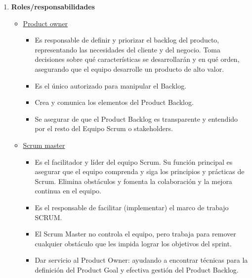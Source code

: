 \documentclass[12pt, letterpaper]{article}
\begin{document}
\begin{enumerate}
    
    \item \textbf{Roles/responsabilidades}
        \begin{itemize}
            \item \underline{Product owner}
                \begin{itemize}
                    \item Es responsable de definir y priorizar el backlog del producto, representando las 
                    necesidades del cliente y del negocio. Toma decisiones sobre qué características se 
                    desarrollarán y en qué orden, asegurando que el equipo desarrolle un producto de alto valor.
                    \item Es el único autorizado para manipular el Backlog.
                    \item Crea y comunica los elementos del Product Backlog.
                    \item Se asegurar de que el Product Backlog es transparente y entendido por el resto del 
                    Equipo Scrum o stakeholders.
                \end{itemize}
            
            \item \underline{Scrum master}
                \begin{itemize}
                    \item Es el facilitador y líder del equipo Scrum. Su función principal es asegurar que el 
                    equipo comprenda y siga los principios y prácticas de Scrum. Elimina obstáculos y fomenta 
                    la colaboración y la mejora continua en el equipo.
                    \item Es el responsable de facilitar (implementar) el marco de trabajo SCRUM.
                    \item El Scrum Master no controla el equipo, pero trabaja para remover cualquier obstáculo 
                    que les impida lograr los objetivos del sprint.
                    \item Dar servicio al Product Owner: ayudando a encontrar técnicas para la definición del 
                    Product Goal y efectiva gestión del Product Backlog.
                \end{itemize}


\end{itemize}
\end{enumerate}
\end{document}
